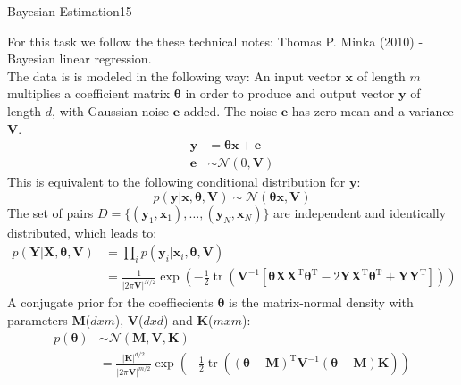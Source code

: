 \begin{questions}
\begin{question}[bonus]{Bayesian Estimation}{15}
\begin{answer}
For this task we follow the these technical notes: Thomas P. Minka (2010) - Bayesian linear regression.\\
The data is is modeled in the following way: An input vector $\boldsymbol{x}$ of length $m$ multiplies a coefficient matrix $\boldsymbol{\theta}$ in order to produce and output vector $\boldsymbol{y}$ of length $d$, with Gaussian noise $\boldsymbol{e}$ added. The noise $\boldsymbol{e}$ has zero mean and a variance $\mathbf{V}$.\\
\begin{equation*}
\begin{aligned} \mathbf{y} &=\mathbf{\boldsymbol{\theta} x}+\mathbf{e} \\ \mathbf{e} & \sim \mathcal{N}(0, \mathbf{V})  \end{aligned}
\end{equation*}
This is equivalent to the following conditional distribution for $\mathbf{y}$:
\begin{equation*}
p(\mathbf{y} | \mathbf{x}, \boldsymbol{\theta}, \mathbf{V})  \sim \mathcal{N}(\boldsymbol{\theta} \mathbf{x}, \mathbf{V})
\end{equation*}
The set of pairs $D=\{(\mathbf{y}_{1}, \mathbf{x}_{1}), \ldots,(\mathbf{y}_{N}, \mathbf{x}_{N})\}$ are independent and identically distributed, which leads to:
\begin{equation}
\begin{aligned} 
p(\mathbf{Y} | \mathbf{X}, \boldsymbol{\theta}, \mathbf{V})&=\prod_{i} p(\mathbf{y}_{i} | \mathbf{x}_{i}, \boldsymbol{\theta}, \mathbf{V})
\\ &=\frac{1}{|2 \pi \mathbf{V}|^{N / 2}} \exp (-\frac{1}{2} \operatorname{tr}(\mathbf{V}^{-1}[\boldsymbol{\theta} \mathbf{X} \mathbf{X}^{\mathrm{T}} \boldsymbol{\theta}^{\mathrm{T}}-2 \mathbf{Y} \mathbf{X}^{\mathrm{T}} \boldsymbol{\theta}^{\mathrm{T}}+\mathbf{Y} \mathbf{Y}^{\mathrm{T}}]))
\end{aligned} 
\label{eq:likelihood}
\end{equation}
A conjugate prior for the coeffiecients $\boldsymbol{\theta}$ is the matrix-normal density with parameters $\mathbf{M}$($dxm$), $\mathbf{V}$($dxd$) and $\mathbf{K}$($mxm$):
\begin{equation}
\begin{aligned} p(\boldsymbol{\theta}) & \sim \mathcal{N}(\mathbf{M}, \mathbf{V}, \mathbf{K}) \\ &=\frac{|\mathbf{K}|^{d / 2}}{|2 \pi \mathbf{V}|^{m / 2}} \exp (-\frac{1}{2} \operatorname{tr}((\boldsymbol{\theta}-\mathbf{M})^{\mathrm{T}} \mathbf{V}^{-1}(\boldsymbol{\theta}-\mathbf{M}) \mathbf{K})) \end{aligned}

\end{equation}
\end{answer}
\end{question}
\end{questions}
